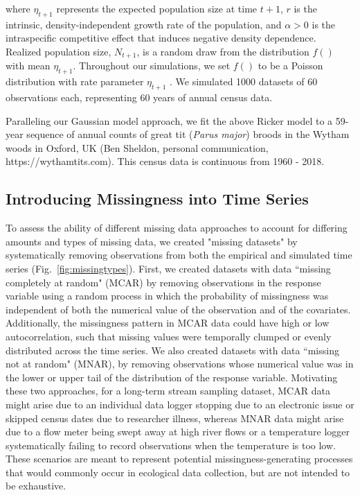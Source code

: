 \documentclass{article}
\begin{document}
\noindent where \(\eta_{t+1}\) represents the expected population size at time \(t+1\), \(r\) is the intrinsic, density-independent growth rate of the population, and $\alpha > 0$ is the intraspecific competitive effect that induces negative density dependence. %
Realized population size, $N_{t+1}$, is a random draw from the distribution $f()$ with mean $\eta_{t+1}$. Throughout our simulations, we set $f()$ to be a Poisson distribution with rate parameter $\eta_{t+1}$%
. We simulated 1000 datasets of 60 observations each, representing 60 years of annual census data. 

Paralleling our Gaussian model approach, we fit the above Ricker model to a 59-year sequence of annual counts of great tit (\textit{Parus major}) broods in the Wytham woods in Oxford, UK (Ben Sheldon, personal communication, https://wythamtits.com). This census data is continuous from 1960 - 2018. %

\subsection*{Introducing Missingness into Time Series}

To assess the ability of different missing data approaches to account for differing amounts and types of missing data, we created "missing datasets" by systematically removing observations from both the empirical and simulated time series (Fig.\ \ref{fig:missingtypes}). First, we created datasets with data  ``missing completely at random" (MCAR) by removing observations in the response variable using a random process in which the probability of missingness was independent of both the numerical value of the observation and of the covariates. Additionally, the missingness pattern in MCAR data could have high or low autocorrelation, such that missing values were temporally clumped or evenly distributed across the time series. We also created datasets with data ``missing not at random" (MNAR), by removing observations whose numerical value was in the lower or upper tail of the distribution of the response variable. Motivating these two approaches, for a long-term stream sampling dataset, MCAR data might arise due to an individual data logger stopping due to an electronic issue or skipped census dates due to researcher illness, whereas MNAR data might arise due to a flow meter being swept away at high river flows or a temperature logger systematically failing to record observations when the temperature is too low. These scenarios are meant to represent potential missingness-generating processes that would commonly occur in ecological data collection, but are not intended to be exhaustive.
\end{document}
